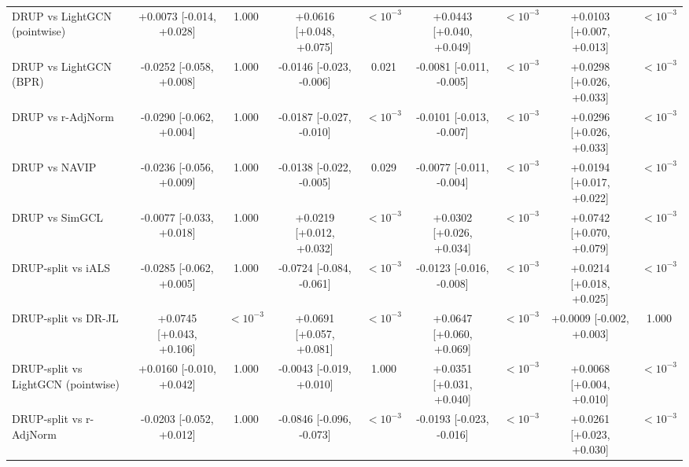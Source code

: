 \begin{tabular}{lcccccccc}
DRUP vs LightGCN (pointwise) & +0.0073 [-0.014, +0.028] & 1.000 & +0.0616 [+0.048, +0.075] & $<10^{-3}$ & +0.0443 [+0.040, +0.049] & $<10^{-3}$ & +0.0103 [+0.007, +0.013] & $<10^{-3}$\\
DRUP vs LightGCN (BPR) & -0.0252 [-0.058, +0.008] & 1.000 & -0.0146 [-0.023, -0.006] & 0.021 & -0.0081 [-0.011, -0.005] & $<10^{-3}$ & +0.0298 [+0.026, +0.033] & $<10^{-3}$\\
DRUP vs r-AdjNorm & -0.0290 [-0.062, +0.004] & 1.000 & -0.0187 [-0.027, -0.010] & $<10^{-3}$ & -0.0101 [-0.013, -0.007] & $<10^{-3}$ & +0.0296 [+0.026, +0.033] & $<10^{-3}$\\
DRUP vs NAVIP & -0.0236 [-0.056, +0.009] & 1.000 & -0.0138 [-0.022, -0.005] & 0.029 & -0.0077 [-0.011, -0.004] & $<10^{-3}$ & +0.0194 [+0.017, +0.022] & $<10^{-3}$\\
DRUP vs SimGCL & -0.0077 [-0.033, +0.018] & 1.000 & +0.0219 [+0.012, +0.032] & $<10^{-3}$ & +0.0302 [+0.026, +0.034] & $<10^{-3}$ & +0.0742 [+0.070, +0.079] & $<10^{-3}$\\
DRUP-split vs iALS & -0.0285 [-0.062, +0.005] & 1.000 & -0.0724 [-0.084, -0.061] & $<10^{-3}$ & -0.0123 [-0.016, -0.008] & $<10^{-3}$ & +0.0214 [+0.018, +0.025] & $<10^{-3}$\\
DRUP-split vs DR-JL & +0.0745 [+0.043, +0.106] & $<10^{-3}$ & +0.0691 [+0.057, +0.081] & $<10^{-3}$ & +0.0647 [+0.060, +0.069] & $<10^{-3}$ & +0.0009 [-0.002, +0.003] & 1.000\\
DRUP-split vs LightGCN (pointwise) & +0.0160 [-0.010, +0.042] & 1.000 & -0.0043 [-0.019, +0.010] & 1.000 & +0.0351 [+0.031, +0.040] & $<10^{-3}$ & +0.0068 [+0.004, +0.010] & $<10^{-3}$\\
DRUP-split vs r-AdjNorm & -0.0203 [-0.052, +0.012] & 1.000 & -0.0846 [-0.096, -0.073] & $<10^{-3}$ & -0.0193 [-0.023, -0.016] & $<10^{-3}$ & +0.0261 [+0.023, +0.030] & $<10^{-3}$\\
\bottomrule
\end{tabular}

